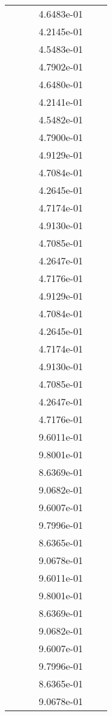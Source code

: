 \begin{xltabular}{\textwidth}{r|rS[table-format=1.3e+2]S[table-format=1.4e+2]S[table-format=1.4e+2]S[table-format=-1.5]}
&  &  & 4.6483e-01 & & \\
&  &  & 4.2145e-01 & & \\
&  &  & 4.5483e-01 & & \\
&  &  & 4.7902e-01 & & \\
&  &  & 4.6480e-01 & & \\
&  &  & 4.2141e-01 & & \\
&  &  & 4.5482e-01 & & \\
&  &  & 4.7900e-01 & & \\
&  &  & 4.9129e-01 & & \\
&  &  & 4.7084e-01 & & \\
&  &  & 4.2645e-01 & & \\
&  &  & 4.7174e-01 & & \\
&  &  & 4.9130e-01 & & \\
&  &  & 4.7085e-01 & & \\
&  &  & 4.2647e-01 & & \\
&  &  & 4.7176e-01 & & \\
&  &  & 4.9129e-01 & & \\
&  &  & 4.7084e-01 & & \\
&  &  & 4.2645e-01 & & \\
&  &  & 4.7174e-01 & & \\
&  &  & 4.9130e-01 & & \\
&  &  & 4.7085e-01 & & \\
&  &  & 4.2647e-01 & & \\
&  &  & 4.7176e-01 & & \\
&  &  & 9.6011e-01 & & \\
&  &  & 9.8001e-01 & & \\
&  &  & 8.6369e-01 & & \\
&  &  & 9.0682e-01 & & \\
&  &  & 9.6007e-01 & & \\
&  &  & 9.7996e-01 & & \\
&  &  & 8.6365e-01 & & \\
&  &  & 9.0678e-01 & & \\
&  &  & 9.6011e-01 & & \\
&  &  & 9.8001e-01 & & \\
&  &  & 8.6369e-01 & & \\
&  &  & 9.0682e-01 & & \\
&  &  & 9.6007e-01 & & \\
&  &  & 9.7996e-01 & & \\
&  &  & 8.6365e-01 & & \\
&  &  & 9.0678e-01 & & \\

\end{xltabular}
